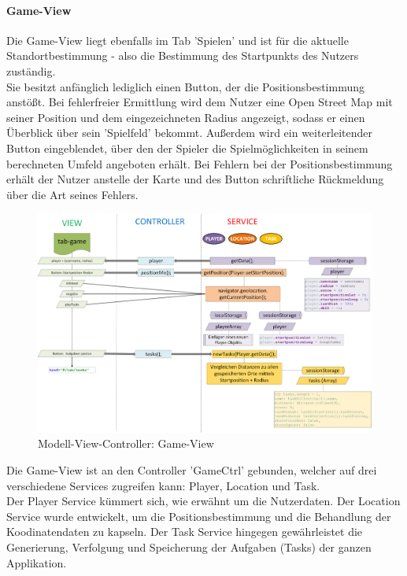 \paragraph{Game-View}
%
%
Die Game-View liegt ebenfalls im Tab 'Spielen' und ist für die aktuelle Standortbestimmung - also die Bestimmung des Startpunkts des Nutzers zuständig.
\\
Sie besitzt anfänglich lediglich einen Button, der die Positionsbestimmung anstößt. Bei fehlerfreier Ermittlung wird dem Nutzer eine Open Street Map mit seiner Position und dem eingezeichneten Radius angezeigt, sodass er einen Überblick über sein 'Spielfeld' bekommt. Außerdem wird ein weiterleitender Button eingeblendet, über den der Spieler die Spielmöglichkeiten in seinem berechneten Umfeld angeboten erhält.
Bei Fehlern bei der Positionsbestimmung erhält der Nutzer anstelle der Karte und des Button schriftliche Rückmeldung über die Art seines Fehlers.
%
%
\begin{figure}[h]
\centering
\includegraphics[width=1\textwidth]{ref/images/03-game-tab.png}
\caption[Modell-View-Controller: Game-View]{Modell-View-Controller: Game-View}
\label{fig:MVC:Game-View}
\end{figure}
%
%
Die Game-View ist an den Controller 'GameCtrl' gebunden, welcher auf drei verschiedene Services zugreifen kann: Player, Location und Task.
\\
Der Player Service kümmert sich, wie erwähnt um die Nutzerdaten. Der Location Service wurde entwickelt, um die Positionsbestimmung und die Behandlung der Koodinatendaten zu kapseln. Der Task Service hingegen gewährleistet die Generierung, Verfolgung und Speicherung der Aufgaben (Tasks) der ganzen Applikation.
